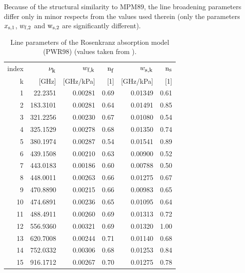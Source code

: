 Because of the structural similarity to MPM89, the line broadening 
parameters differ only in minor respects from the values used therein 
(only the parameters $x_{\rm s,1}$, $w_{\rm f,2}$ and $\rm w_{\rm s,2}$ 
are significantly different).
%
\begin{table}[!htb]
\begin{center}
\begin{tabular}{rrrrrr}
 \hline
 index &  $\nu_{\mbox{\rm \small k}}$      & $w_{\mbox{\rm \small f,k}}$     & ${\rm n}_{\mbox{\rm \small f}}$ & $w_{\mbox{\rm \small s,k}}$     & ${\rm n}_{\mbox{\rm \small s}}$ \\
   k   &  [GHz]       & [GHz/kPa] & [1]   & [GHz/kPa] & [1] \\ 
 \hline
   1   &   22.2351    & 0.00281   & 0.69  & 0.01349   &  0.61 \\
   2   &  183.3101    & 0.00281   & 0.64  & 0.01491   &  0.85 \\
   3   &  321.2256    & 0.00230   & 0.67  & 0.01080   &  0.54 \\
  4    &  325.1529    & 0.00278   & 0.68  & 0.01350   &  0.74 \\
  5    &  380.1974    & 0.00287   & 0.54  & 0.01541   &  0.89 \\
  6    &  439.1508    & 0.00210   & 0.63  & 0.00900   &  0.52 \\
  7    &  443.0183    & 0.00186   & 0.60  & 0.00788   &  0.50 \\
  8    &  448.0011    & 0.00263   & 0.66  & 0.01275   &  0.67 \\
  9    &  470.8890    & 0.00215   & 0.66  & 0.00983   &  0.65 \\
  10   &  474.6891    & 0.00236   & 0.65  & 0.01095   &  0.64 \\
  11   &  488.4911    & 0.00260   & 0.69  & 0.01313   &  0.72 \\
  12   &  556.9360    & 0.00321   & 0.69  & 0.01320   &  1.00 \\
  13   &  620.7008    & 0.00244   & 0.71  & 0.01140   &  0.68 \\
  14   &  752.0332    & 0.00306   & 0.68  & 0.01253   &  0.84 \\
  15   &  916.1712    & 0.00267   & 0.70  & 0.01275   &  0.78 \\
  \hline
\end{tabular}
\end{center}
  \caption[PWR98 spectral line data.]{Line parameters of the Rosenkranz absorption model (PWR98) 
  (values taken from \citet{pwr:98}).}
\label{tab:pwr98linelist}
\end{table}



